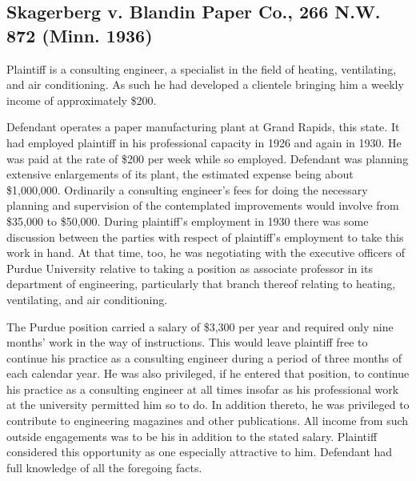 \documentclass[
  letterpaper,
  11pt,
  DIV=9,
  openright]{scrbook}
\begin{document}
\subsection{Skagerberg v. Blandin Paper Co., 266 N.W. 872 (Minn.
1936)}\label{skagerberg-v.-blandin-paper-co.-266-n.w.-872-minn.-1936}

Plaintiff is a consulting engineer, a specialist in the field of
heating, ventilating, and air conditioning. As such he had developed a
clientele bringing him a weekly income of approximately \$200.

Defendant operates a paper manufacturing plant at Grand Rapids, this
state. It had employed plaintiff in his professional capacity in 1926
and again in 1930. He was paid at the rate of \$200 per week while so
employed. Defendant was planning extensive enlargements of its plant,
the estimated expense being about \$1,000,000. Ordinarily a consulting
engineer's fees for doing the necessary planning and supervision of the
contemplated improvements would involve from \$35,000 to \$50,000.
During plaintiff's employment in 1930 there was some discussion between
the parties with respect of plaintiff's employment to take this work in
hand. At that time, too, he was negotiating with the executive officers
of Purdue University relative to taking a position as associate
professor in its department of engineering, particularly that branch
thereof relating to heating, ventilating, and air conditioning.

The Purdue position carried a salary of \$3,300 per year and required
only nine months' work in the way of instructions. This would leave
plaintiff free to continue his practice as a consulting engineer during
a period of three months of each calendar year. He was also privileged,
if he entered that position, to continue his practice as a consulting
engineer at all times insofar as his professional work at the university
permitted him so to do. In addition thereto, he was privileged to
contribute to engineering magazines and other publications. All income
from such outside engagements was to be his in addition to the stated
salary. Plaintiff considered this opportunity as one especially
attractive to him. Defendant had full knowledge of all the foregoing
facts.
\end{document}
